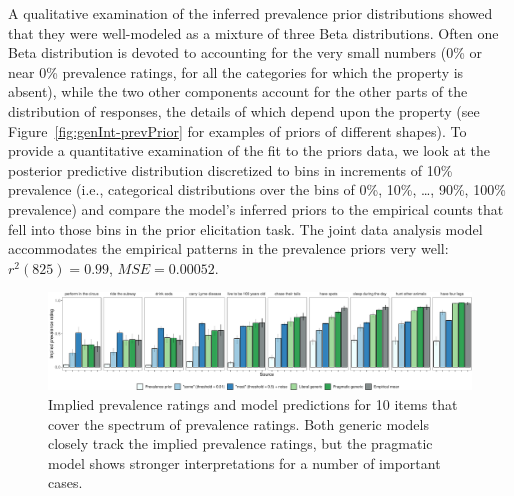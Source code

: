 \documentclass[floatsintext,doc]{apa6}
\begin{document}
A qualitative examination of the inferred prevalence prior distributions showed that they were well-modeled as a mixture of three Beta distributions.
Often one Beta distribution is devoted to accounting for the very small numbers (0\% or near 0\% prevalence ratings, for all the categories for which the property is absent), while the two other components account for the other parts of the distribution of responses, the details of which depend upon the property (see Figure~\ref{fig:genInt-prevPrior} for examples of priors of different shapes).
To provide a quantitative examination of the fit to the priors data, we look at the posterior predictive distribution discretized to bins in increments of 10\% prevalence (i.e., categorical distributions over the bins of 0\%, 10\%, \ldots{}, 90\%, 100\% prevalence) and compare the model's inferred priors to the empirical counts that fell into those bins in the prior elicitation task.
The joint data analysis model accommodates the empirical patterns in the prevalence priors very well: \(r^2(825) = 0.99\), \(MSE = 0.00052\).


\begin{figure}
\centering
\includegraphics{genint_files/figure-latex/genint-modelingResults-bars-1.pdf}
\caption{Implied prevalence ratings and model predictions for 10 items that cover the spectrum of prevalence ratings. 
Both generic models closely track the implied prevalence ratings, but the pragmatic model shows stronger interpretations for a number of important cases.}
\label{fig:genint-modelingResults-bars}
\end{figure}
\end{document}
